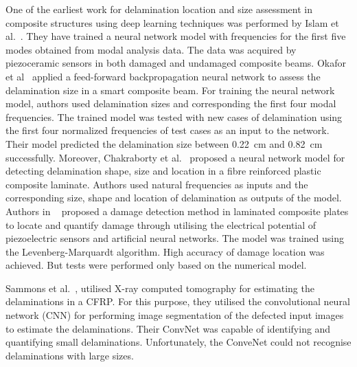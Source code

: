 \documentclass[preprint,9pt]{elsarticle}
\begin{document}
One of the earliest work for delamination location and size assessment in composite structures using deep learning techniques was performed by Islam et al.~\cite{islam1994damage}. 
They have trained a neural network model with frequencies for the first five modes obtained from modal analysis data. 
The data was acquired by piezoceramic sensors in both damaged and undamaged composite beams.
 Okafor et al~\cite{okafor1996delamination} applied a feed-forward backpropagation neural network to assess the delamination size in a smart composite beam. 
 For training the neural network model, authors used delamination sizes and corresponding the first four modal frequencies. 
 The trained model was tested with new cases of delamination using the first four normalized frequencies of test cases as an input to the network. 
 Their model predicted the delamination size between 0.22~cm and 0.82~cm successfully.
 Moreover, Chakraborty et al.~\cite{chakraborty2005artificial} proposed a neural network model for detecting delamination shape, size and location in a fibre reinforced plastic composite laminate.
 Authors used natural frequencies as inputs and the corresponding size, shape and location of delamination as outputs of the model. 
 Authors in ~\cite{roseiro2005neural}  proposed a damage detection method in laminated composite plates to locate and quantify damage through utilising the electrical potential of piezoelectric sensors and artificial neural networks. 
 The model was trained using the Levenberg-Marquardt algorithm. High accuracy of damage location was achieved.
 But tests were performed only based on the numerical model.  

 Sammons et al.~\cite{sammons2016segmenting}, utilised X-ray computed tomography for estimating the delaminations in a CFRP. 
 For this purpose, they utilised the convolutional neural network (CNN) for performing image segmentation of the defected input images to estimate the delaminations. 
 Their ConvNet was capable of identifying and quantifying small delaminations. 
 Unfortunately, the ConveNet could not recognise delaminations with large sizes.
 
\end{document}
